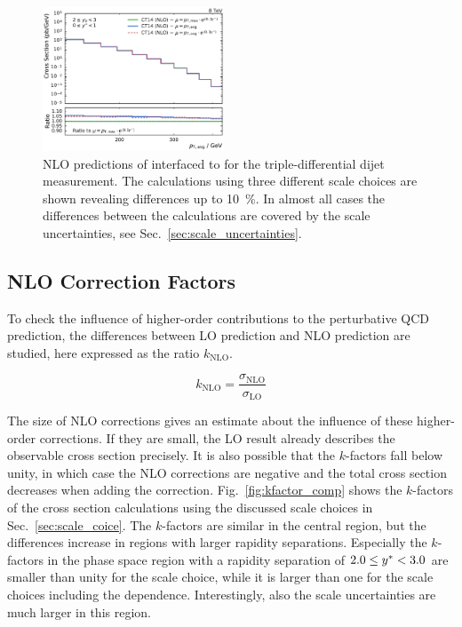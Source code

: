 \begin{figure}[htp]
    \includegraphics[width=0.48\textwidth]{figures/theory/nlo_xs_comp_yb2ys0.pdf}
    \caption[\NLOJETPP prediction of triple-differential dijet cross section]{
        NLO predictions of \fastnlo interfaced to \NLOJETPP for the
        triple-differential dijet measurement. The calculations using three
        different scale choices are shown revealing differences up to
        \SI{10}{\percent}. In
        almost all cases the differences between the calculations are covered by
        the scale uncertainties, see Sec.~\ref{sec:scale_uncertainties}.}
    \label{fig:xs_nlo_comp}
\end{figure}


\subsection{NLO Correction Factors}
\label{sec:k_factors}

To check the influence of higher-order contributions to the perturbative QCD
prediction, the differences between LO prediction and NLO
prediction are studied, here expressed as the ratio $k_\mathrm{NLO}$.

\begin{equation*}
    k_{\mathrm{NLO}} = \frac{\sigma_{\mathrm{NLO}}}{\sigma_{\mathrm{LO}}}
\end{equation*}

The size of NLO corrections gives an estimate about the influence of these
higher-order corrections. If they are small, the LO result already describes the
observable cross section precisely. It is also possible that the $k$-factors
fall below unity, in which case the NLO corrections are negative and the total cross
section decreases when adding the correction.  Fig.~\ref{fig:kfactor_comp} shows
the $k$-factors of the \NLOJETPP cross section calculations using the discussed
scale choices in Sec.~\ref{sec:scale_coice}. The $k$-factors are similar in the
central region, but the differences increase in regions with larger rapidity
separations. Especially the $k$-factors in the phase space region with a
rapidity separation of $2.0 \leq y^{*} < 3.0$ are smaller than unity for the
\ptavg scale choice, while it is larger than one for the scale choices including
the \ystar dependence. Interestingly, also the scale uncertainties are much
larger in this region.

